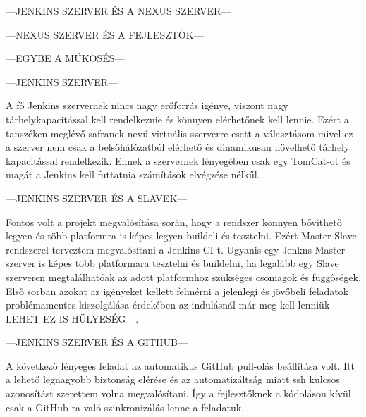 ---JENKINS SZERVER ÉS A NEXUS SZERVER---

---NEXUS SZERVER ÉS A FEJLESZTŐK---

---EGYBE A MŰKÖSÉS---


---JENKINS SZERVER---

A fő Jenkins szervernek nincs nagy erőforrás igénye, viszont nagy tárhelykapacitással kell rendelkeznie és könnyen elérhetőnek kell lennie. Ezért a tanszéken meglévő safranek nevű virtuális szerverre esett a választásom mivel ez a szerver nem csak a belsőhálózatból elérhető és dinamikusan növelhető tárhely kapacitással rendelkezik. Ennek a szervernek lényegében csak egy TomCat-ot és magát a Jenkins kell futtatnia számítások elvégzése nélkűl.

---JENKINS SZERVER ÉS A SLAVEK---

Fontos volt a projekt megvalósítása során, hogy a rendszer könnyen bővíthető legyen és több platformra is képes legyen buildeli és tesztelni. Ezért Master-Slave rendszerel terveztem megvalósítani a Jenkins CI-t. Ugyanis egy Jenkns Master szerver is képes több platformara tesztelni és buildelni, ha legalább egy Slave szerveren megtalálhatóak az adott platformhoz szükséges csomagok és függőségek. Első sorban azokat az igényeket kellett felmérni a jelenlegi és jövőbeli feladatok problémamentes kiszolgálása érdekében az indulásnál már meg kell lenniük---LEHET EZ IS HÜLYESÉG---.

---JENKINS SZERVER ÉS A GITHUB---

A következő lényeges feladat az automatikus GitHub pull-olás beállítása volt. Itt a lehető legnagyobb biztonság elérése és az automatizáltság miatt ssh kulcsos azonosítást szerettem volna megvalósítani. Így a fejlesztőknek a kódoláson kívül csak a GitHub-ra való szinkronizálás lenne a feladatuk.